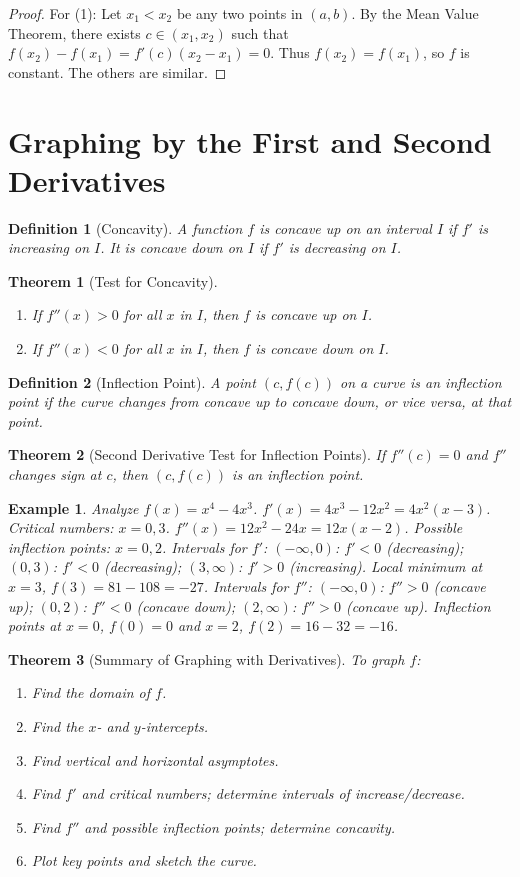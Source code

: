 \documentclass[11pt,a4paper]{article}
\newtheorem{example}{Example}
\newtheorem{theorem}{Theorem}
\newtheorem{definition}{Definition}
\begin{document}
\begin{proof}
For (1): Let $x_1 < x_2$ be any two points in $(a, b)$. By the Mean Value Theorem, there exists $c \in (x_1, x_2)$ such that $f(x_2) - f(x_1) = f'(c)(x_2 - x_1) = 0$. Thus $f(x_2) = f(x_1)$, so $f$ is constant. The others are similar.
\end{proof}
\section{Graphing by the First and Second Derivatives}
\begin{definition}[Concavity]
A function $f$ is \textit{concave up} on an interval $I$ if $f'$ is increasing on $I$. It is \textit{concave down} on $I$ if $f'$ is decreasing on $I$.
\end{definition}
\begin{theorem}[Test for Concavity]
\begin{enumerate}
\item If $f''(x) > 0$ for all $x$ in $I$, then $f$ is concave up on $I$.
\item If $f''(x) < 0$ for all $x$ in $I$, then $f$ is concave down on $I$.
\end{enumerate}
\end{theorem}
\begin{definition}[Inflection Point]
A point $(c, f(c))$ on a curve is an \textit{inflection point} if the curve changes from concave up to concave down, or vice versa, at that point.
\end{definition}
\begin{theorem}[Second Derivative Test for Inflection Points]
If $f''(c) = 0$ and $f''$ changes sign at $c$, then $(c, f(c))$ is an inflection point.
\end{theorem}
\begin{example}
Analyze $f(x) = x^4 - 4x^3$.
$f'(x) = 4x^3 - 12x^2 = 4x^2(x - 3)$. Critical numbers: $x = 0, 3$.
$f''(x) = 12x^2 - 24x = 12x(x - 2)$. Possible inflection points: $x = 0, 2$.
Intervals for $f'$: $(-\infty, 0)$: $f' < 0$ (decreasing); $(0, 3)$: $f' < 0$ (decreasing); $(3, \infty)$: $f' > 0$ (increasing).
Local minimum at $x = 3$, $f(3) = 81 - 108 = -27$.
Intervals for $f''$: $(-\infty, 0)$: $f'' > 0$ (concave up); $(0, 2)$: $f'' < 0$ (concave down); $(2, \infty)$: $f'' > 0$ (concave up).
Inflection points at $x = 0$, $f(0) = 0$ and $x = 2$, $f(2) = 16 - 32 = -16$.
\end{example}
\begin{theorem}[Summary of Graphing with Derivatives]
To graph $f$:
\begin{enumerate}
\item Find the domain of $f$.
\item Find the $x$- and $y$-intercepts.
\item Find vertical and horizontal asymptotes.
\item Find $f'$ and critical numbers; determine intervals of increase/decrease.
\item Find $f''$ and possible inflection points; determine concavity.
\item Plot key points and sketch the curve.
\end{enumerate}
\end{theorem}
\end{document}
